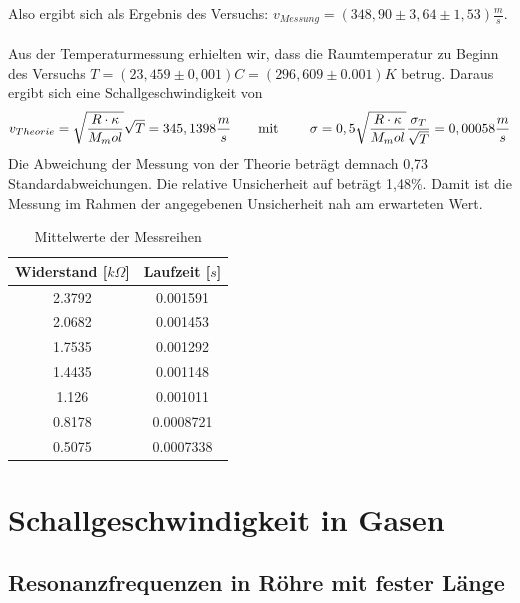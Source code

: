 \documentclass[12pt,a4paper]{article}
\begin{document}
Also ergibt sich als Ergebnis des Versuchs: $v_{Messung} = (348,90 \pm 3,64 \pm 1,53) \frac{m}{s}$. \\\\
Aus der Temperaturmessung erhielten wir, dass die Raumtemperatur zu Beginn des Versuchs $T = (23,459 \pm 0,001)C = (296,609 \pm 0.001)K$ betrug.
Daraus ergibt sich eine Schallgeschwindigkeit von
\begin{equation}
v_{Theorie} =\sqrt{\frac{R\cdot\kappa}{M_mol}}\sqrt{T} = 345,1398 \frac{m}{s} \text{\qquad mit \qquad}
\sigma = 0,5 \sqrt{\frac{R\cdot\kappa}{M_mol}} \frac{\sigma_T}{\sqrt{T}} = 0,00058 \frac{m}{s}
\end{equation}
Die Abweichung der Messung von der Theorie beträgt demnach 0,73 Standardabweichungen. Die relative Unsicherheit auf  beträgt 1,48\%. Damit ist die Messung im Rahmen der angegebenen Unsicherheit nah am erwarteten Wert.
\begin{table}
	\begin{center}
		\begin{tabular}{|c|c|}
			\hline
			\textbf{Widerstand [$k\Omega$]} & \textbf{Laufzeit [$s$]} \\
			\hline
			2.3792 & 0.001591 \\
			\hline
			2.0682 & 0.001453 \\
			\hline
			1.7535 & 0.001292 \\
			\hline
			1.4435 & 0.001148 \\
			\hline
			1.126 & 0.001011 \\
			\hline
			0.8178 & 0.0008721 \\
			\hline
			0.5075 &  0.0007338 \\
			\hline
		\end{tabular}
	\end{center}
	\caption{Mittelwerte der Messreihen}
\end{table}











\section{Schallgeschwindigkeit in Gasen}

\subsection{Resonanzfrequenzen in Röhre mit fester Länge}
\end{document}
